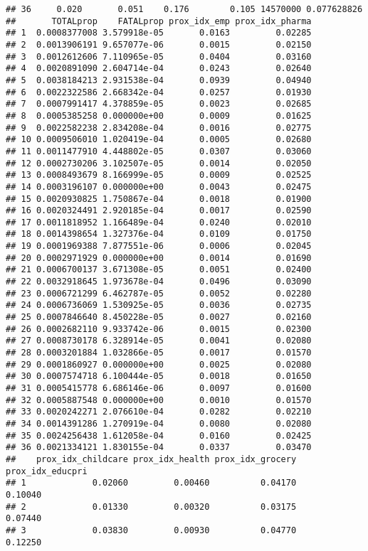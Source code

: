 \documentclass[]{article}
\begin{document}
\begin{verbatim}
## 36     0.020       0.051    0.176        0.105 14570000 0.077628826
##       TOTALprop    FATALprop prox_idx_emp prox_idx_pharma
## 1  0.0008377008 3.579918e-05       0.0163         0.02285
## 2  0.0013906191 9.657077e-06       0.0015         0.02150
## 3  0.0012612606 7.110965e-05       0.0404         0.03160
## 4  0.0020891090 2.604714e-04       0.0243         0.02640
## 5  0.0038184213 2.931538e-04       0.0939         0.04940
## 6  0.0022322586 2.668342e-04       0.0257         0.01930
## 7  0.0007991417 4.378859e-05       0.0023         0.02685
## 8  0.0005385258 0.000000e+00       0.0009         0.01625
## 9  0.0022582238 2.834208e-04       0.0016         0.02775
## 10 0.0009506010 1.020419e-04       0.0005         0.02680
## 11 0.0011477910 4.448802e-05       0.0307         0.03060
## 12 0.0002730206 3.102507e-05       0.0014         0.02050
## 13 0.0008493679 8.166999e-05       0.0009         0.02525
## 14 0.0003196107 0.000000e+00       0.0043         0.02475
## 15 0.0020930825 1.750867e-04       0.0018         0.01900
## 16 0.0020324491 2.920185e-04       0.0017         0.02590
## 17 0.0011818952 1.166489e-04       0.0240         0.02010
## 18 0.0014398654 1.327376e-04       0.0109         0.01750
## 19 0.0001969388 7.877551e-06       0.0006         0.02045
## 20 0.0002971929 0.000000e+00       0.0014         0.01690
## 21 0.0006700137 3.671308e-05       0.0051         0.02400
## 22 0.0032918645 1.973678e-04       0.0496         0.03090
## 23 0.0006721299 6.462787e-05       0.0052         0.02280
## 24 0.0006736069 1.530925e-05       0.0036         0.02735
## 25 0.0007846640 8.450228e-05       0.0027         0.02160
## 26 0.0002682110 9.933742e-06       0.0015         0.02300
## 27 0.0008730178 6.328914e-05       0.0041         0.02080
## 28 0.0003201884 1.032866e-05       0.0017         0.01570
## 29 0.0001860927 0.000000e+00       0.0025         0.02080
## 30 0.0007574718 6.100444e-05       0.0018         0.01650
## 31 0.0005415778 6.686146e-06       0.0097         0.01600
## 32 0.0005887548 0.000000e+00       0.0010         0.01570
## 33 0.0020242271 2.076610e-04       0.0282         0.02210
## 34 0.0014391286 1.270919e-04       0.0080         0.02080
## 35 0.0024256438 1.612058e-04       0.0160         0.02425
## 36 0.0021334121 1.830155e-04       0.0337         0.03470
##    prox_idx_childcare prox_idx_health prox_idx_grocery prox_idx_educpri
## 1             0.02060         0.00460          0.04170          0.10040
## 2             0.01330         0.00320          0.03175          0.07440
## 3             0.03830         0.00930          0.04770          0.12250

\end{verbatim}
\end{document}
